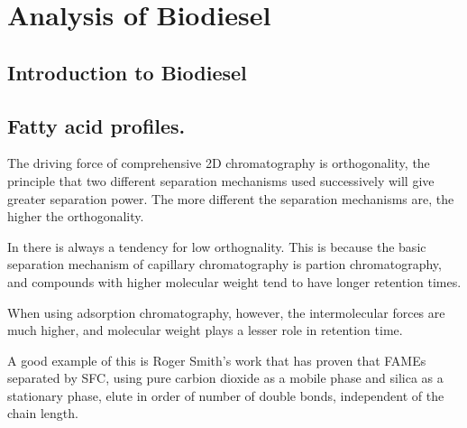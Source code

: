 
\chapter{Analysis of Biodiesel} %
\label{Chapter6}


\section{Introduction to Biodiesel}

\section{Fatty acid profiles.}

The driving force of comprehensive 2D chromatography is orthogonality, the principle that two different separation mechanisms used successively will give greater separation power. The more different the separation mechanisms are, the higher the orthogonality. 

In \GCxGC there is always a tendency for low orthognality. This is because the basic separation mechanism of capillary chromatography is partion chromatography, and compounds with higher molecular weight tend to have longer retention times.

When using adsorption chromatography, however, the intermolecular forces are much higher, and molecular weight plays a lesser role in retention time.

A good example of this is Roger Smith's work that has proven that FAMEs separated by SFC, using pure carbion dioxide as a mobile phase and silica as a stationary phase, elute in order of number of double bonds, independent of the chain length. 